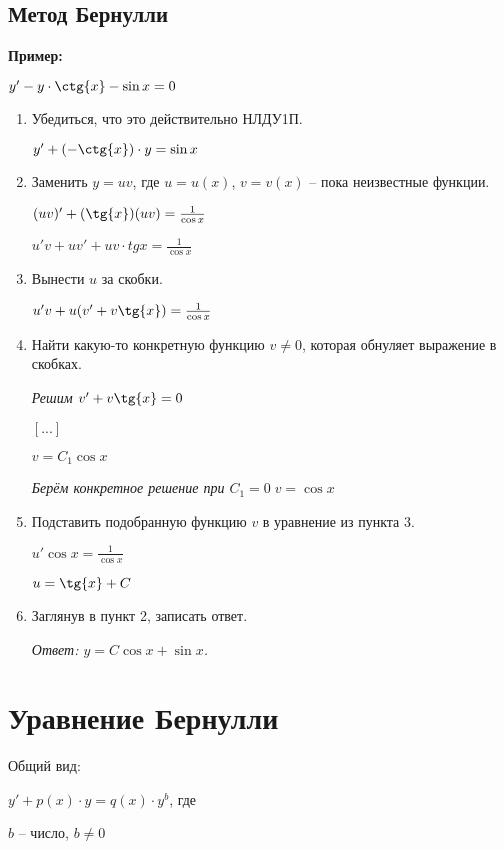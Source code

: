\documentclass[10pt, a4paper]{article}
\begin{document}
\subsection{Метод Бернулли}
\textbf{Пример:}
\par $y' - y \cdot \ctg{x} - \sin{x} = 0$
\begin{enumerate}
    \item Убедиться, что это действительно НЛДУ1П.
        \par $y' + (-\ctg{x}) \cdot y = \sin{x}$
    \item Заменить $y = uv$, где $u = u(x)$, $v = v(x)$ -- пока неизвестные функции.
        \par $(uv)' + (\tg{x})(uv) = \frac{1}{\cos{x}}$
        \par $u'v + uv' + uv \cdot tg{x} = \frac{1}{\cos{x}}$
    \item Вынести $u$ за скобки.
        \par $u'v + u(v' + v\tg{x}) = \frac{1}{\cos{x}}$
    \item Найти какую-то конкретную функцию $v \neq 0$, которая обнуляет выражение в скобках.
        \par \textit{Решим $v' + v\tg{x} = 0$}
        \par $[...]$
        \par $v = C_{1}\cos{x}$
        \par \textit{Берём конкретное решение при $C_{1} = 0\;v = \cos{x}$}
    \item Подставить подобранную функцию $v$ в уравнение из пункта 3.
        \par $u'\cos{x} = \frac{1}{\cos{x}}$
        \par $u = \tg{x} + C$
    \item Заглянув в пункт 2, записать ответ.
        \par\textit{Ответ: $y = C\cos{x} + \sin{x}$.}
\end{enumerate}


\section{Уравнение Бернулли}
Общий вид:
\par $y' + p(x) \cdot y = q(x) \cdot y^b$, где
\par $b$ -- число, $b \neq 0$
\end{document}
